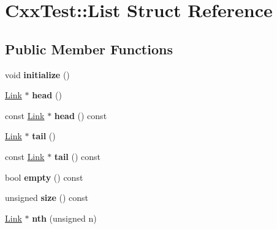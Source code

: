 \hypertarget{structCxxTest_1_1List}{\section{Cxx\-Test\-:\-:List Struct Reference}
\label{structCxxTest_1_1List}
}
\subsection*{Public Member Functions}
\begin{DoxyCompactItemize}
\item 
\hypertarget{structCxxTest_1_1List_a4cc0340ed57c3d9fe555976e823dc00b}{void {\bfseries initialize} ()}\label{structCxxTest_1_1List_a4cc0340ed57c3d9fe555976e823dc00b}

\item 
\hypertarget{structCxxTest_1_1List_a2d1be547ec21a95d2949a2588fafbe52}{\hyperlink{classCxxTest_1_1Link}{Link} $\ast$ {\bfseries head} ()}\label{structCxxTest_1_1List_a2d1be547ec21a95d2949a2588fafbe52}

\item 
\hypertarget{structCxxTest_1_1List_af87f82f984f0fdecc5a8afddcad598ac}{const \hyperlink{classCxxTest_1_1Link}{Link} $\ast$ {\bfseries head} () const }\label{structCxxTest_1_1List_af87f82f984f0fdecc5a8afddcad598ac}

\item 
\hypertarget{structCxxTest_1_1List_a8b55611911ff792152b759e08f09aa12}{\hyperlink{classCxxTest_1_1Link}{Link} $\ast$ {\bfseries tail} ()}\label{structCxxTest_1_1List_a8b55611911ff792152b759e08f09aa12}

\item 
\hypertarget{structCxxTest_1_1List_a0024c46c512d4ac28fd094918a89bc20}{const \hyperlink{classCxxTest_1_1Link}{Link} $\ast$ {\bfseries tail} () const }\label{structCxxTest_1_1List_a0024c46c512d4ac28fd094918a89bc20}

\item 
\hypertarget{structCxxTest_1_1List_a0b916bd4d66d7b1649f75f34212665d7}{bool {\bfseries empty} () const }\label{structCxxTest_1_1List_a0b916bd4d66d7b1649f75f34212665d7}

\item 
\hypertarget{structCxxTest_1_1List_af2b34bc39a38966d5bb377e37dbef385}{unsigned {\bfseries size} () const }\label{structCxxTest_1_1List_af2b34bc39a38966d5bb377e37dbef385}

\item 
\hypertarget{structCxxTest_1_1List_a2e8dd0317136a902e4d994ca54e08220}{\hyperlink{classCxxTest_1_1Link}{Link} $\ast$ {\bfseries nth} (unsigned n)}\label{structCxxTest_1_1List_a2e8dd0317136a902e4d994ca54e08220}


\end{DoxyCompactItemize}
